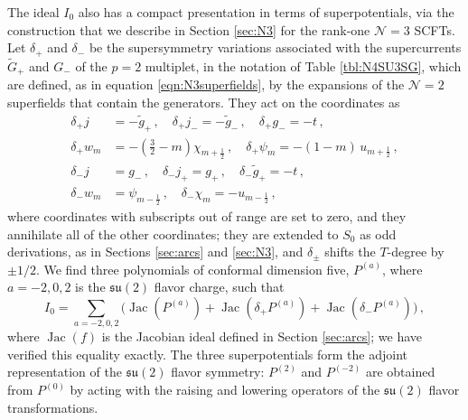\documentclass[12pt]{article}
\numberwithin{equation}{section}
\numberwithin{figure}{section}
\theoremstyle{plain}
\theoremstyle{definition}
\begin{document}
The ideal $I_0$ also has a compact presentation in terms of superpotentials, via the construction that we describe in Section \ref{sec:N3} for the rank-one $\mathcal{N}=3$ SCFTs. Let $\delta_+$ and $\delta_-$ be the supersymmetry variations associated with the supercurrents $\widetilde{G}_+$ and $G_-$ of the $p = 2$ multiplet, in the notation of Table \ref{tbl:N4SU3SG}, which are defined, as in equation \eqref{eqn:N3superfields}, by the expansions of the $\mathcal{N}=2$ superfields that contain the generators. They act on the coordinates as
\begin{equation}\label{eqn:N4SU3delta}
  \begin{aligned}
    \delta_+ j &= -\widetilde{g}_+ \,, \quad \delta_+ j_- = -\widetilde{g}_- \,, \quad \delta_+ g_- = -t \,, \\
    \delta_+ w_m &= -\left(\tfrac{3}{2} - m\right) \chi_{m + \frac{1}{2}} \,, \quad \delta_+ \psi_m = -(1 - m) \, u_{m + \frac{1}{2}} \,, \\
    \delta_- j &= g_- \,, \quad \delta_- j_+ = g_+ \,, \quad \delta_- \widetilde{g}_+ = -t \,, \\
    \delta_- w_m &= \psi_{m - \frac{1}{2}} \,, \quad \delta_- \chi_m = -u_{m - \frac{1}{2}} \,,
  \end{aligned}
\end{equation}
where coordinates with subscripts out of range are set to zero, and they annihilate all of the other coordinates; they are extended to $S_0$ as odd derivations, as in Sections \ref{sec:arcs} and \ref{sec:N3}, and $\delta_\pm$ shifts the $T$-degree by $\pm1/2$. We find three polynomials of conformal dimension five, $P^{(a)}$, where $a = -2, 0, 2$ is the $\mathfrak{su}(2)$ flavor charge, such that
\begin{equation}\label{eqn:N4SU3Jac}
    I_0 = \sum_{a = -2, 0, 2} \Big( \operatorname{Jac}(P^{(a)}) + \operatorname{Jac}(\delta_+ P^{(a)}) + \operatorname{Jac}(\delta_- P^{(a)}) \Big) \,,
\end{equation}
where $\operatorname{Jac}(f)$ is the Jacobian ideal defined in Section \ref{sec:arcs}; we have verified this equality exactly. The three superpotentials form the adjoint representation of the $\mathfrak{su}(2)$ flavor symmetry: $P^{(2)}$ and $P^{(-2)}$ are obtained from $P^{(0)}$ by acting with the raising and lowering operators of the $\mathfrak{su}(2)$ flavor transformations.
\end{document}

